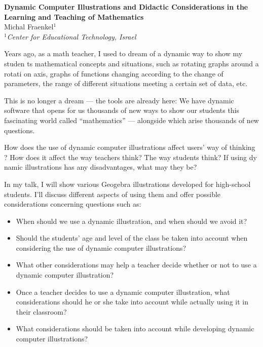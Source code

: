 \documentclass[11pt]{article}
\begin{document}
%
\vspace{-0.8cm}
\begin{flushleft}
\Large \textbf{\noindent
Dynamic Computer Illustrations and Didactic Considerations in the Learning and
Teaching of Mathematics}
\\
\vspace{0.5cm}
\normalsize
\normalsize{
Michal Fraenkel$^1$
} \\
\vspace{5mm}
\textit{\footnotesize
$^1$Center for Educational Technology, Israel
}
\end{flushleft}

Years ago, as a math teacher, I used to dream of a dynamic way to show my
studen ts mathematical concepts and situations, such as rotating graphs
around a rotati on axis, graphs of functions changing according to the
change of parameters, the range of different situations meeting a certain
set of data, etc.

This is no longer a dream --- the tools are already here: We have
dynamic software that opens for us thousands of new ways to show our
students this fascinating world called ``mathematics'' --- alongside which
arise thousands of new questions.

How does the use of dynamic computer illustrations affect users' way of
thinking ? How does it affect the way teachers think? The way students
think? If using dy namic illustrations has any disadvantages, what may
they be?

In my talk, I will show various Geogebra illustrations developed for
high-school students.  I'll discuss different aspects of using them and
offer possible considerations concerning questions such as:
\begin{itemize}
\item When should we use a dynamic illustration, and when should we avoid it?
\item Should the students' age and level of the class be taken into account
when considering the use of dynamic computer illustrations?
\item What other considerations may help a teacher decide whether or not
to use a dynamic computer illustration?
\item Once a teacher decides to use a dynamic computer illustration, what
considerations should he or she take into account while actually using it
in their classroom?
\item What considerations should be taken into account while developing
dynamic computer illustrations?
\end{itemize}
\end{document}
